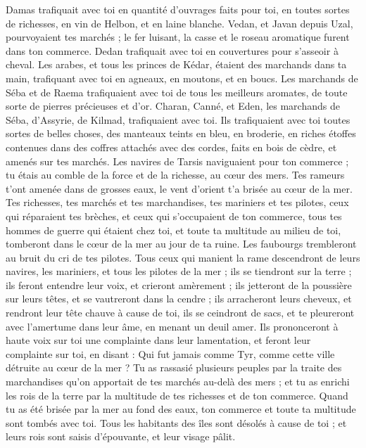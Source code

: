 \begin{multicols}{2}
Damas trafiquait avec toi en quantité d'ouvrages faits pour toi, en toutes sortes de richesses, en vin de Helbon, et en laine blanche.
Vedan, et Javan depuis Uzal, pourvoyaient tes marchés ; le fer luisant, la casse et le roseau aromatique furent dans ton commerce.
Dedan trafiquait avec toi en couvertures pour s’asseoir à cheval.
Les arabes, et tous les princes de Kédar, étaient des marchands dans ta main, trafiquant avec toi en agneaux, en moutons, et en boucs.
Les marchands de Séba et de Raema trafiquaient avec toi de tous les meilleurs aromates, de toute sorte de pierres précieuses et d’or.
Charan, Canné, et Eden, les marchands de Séba, d’Assyrie, de Kilmad, trafiquaient avec toi.
Ils trafiquaient avec toi toutes sortes de belles choses, des manteaux teints en bleu, en broderie, en riches étoffes contenues dans des coffres attachés avec des cordes, faits en bois de cèdre, et amenés sur tes marchés.
Les navires de Tarsis naviguaient pour ton commerce ; tu étais au comble de la force et de la richesse, au cœur des mers.
Tes rameurs t'ont amenée dans de grosses eaux, le vent d'orient t'a brisée au cœur de la mer.
Tes richesses, tes marchés et tes marchandises, tes mariniers et tes pilotes, ceux qui réparaient tes brèches, et ceux qui s’occupaient de ton commerce, tous tes hommes de guerre qui étaient chez toi, et toute ta multitude au milieu de toi, tomberont dans le cœur de la mer au jour de ta ruine\FTNT{}.
Les faubourgs trembleront au bruit du cri de tes pilotes.
Tous ceux qui manient la rame descendront de leurs navires, les mariniers, et tous les pilotes de la mer ; ils se tiendront sur la terre ;
ils feront entendre leur voix, et crieront amèrement ; ils jetteront de la poussière sur leurs têtes, et se vautreront dans la cendre ;
ils arracheront leurs cheveux, et rendront leur tête chauve à cause de toi, ils se ceindront de sacs, et te pleureront avec l’amertume dans leur âme, en menant un deuil amer.
Ils prononceront à haute voix sur toi une complainte dans leur lamentation, et feront leur complainte sur toi, en disant : Qui fut jamais comme Tyr, comme cette ville détruite au cœur de la mer ?
Tu as rassasié plusieurs peuples par la traite des marchandises qu'on apportait de tes marchés au-delà des mers ; et tu as enrichi les rois de la terre par la multitude de tes richesses et de ton commerce.
Quand tu as été brisée par la mer au fond des eaux, ton commerce et toute ta multitude sont tombés avec toi.
Tous les habitants des îles sont désolés à cause de toi ; et leurs rois sont saisis d’épouvante, et leur visage pâlit.

\end{multicols}

